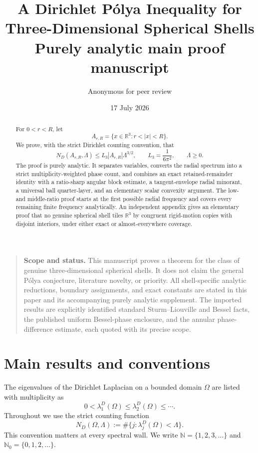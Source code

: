 \documentclass[11pt]{article}
\title{A Dirichlet P\'olya Inequality for\\Three-Dimensional Spherical Shells\\[0.4em]
\large Purely analytic main proof manuscript}
\author{Anonymous for peer review}
\date{17 July 2026}
\numberwithin{equation}{section}
\theoremstyle{definition}
\theoremstyle{remark}
\newcommand{\R}{\mathbb R}
\newcommand{\N}{\mathbb N}
\newcommand{\Nzero}{\mathbb N_0}
\begin{document}
\maketitle
\thispagestyle{titlepage}

\begin{quote}
\small
\textbf{Scope and status.}
This manuscript proves a theorem for the class of genuine three-dimensional
spherical shells.  It does not claim the general P\'olya conjecture,
literature novelty, or priority.  All shell-specific analytic reductions,
boundary assignments, and exact constants are stated in this paper and its
accompanying purely analytic supplement.  The imported results are explicitly
identified standard Sturm--Liouville and Bessel facts, the published uniform
Bessel-phase enclosure, and the annular phase-difference estimate, each quoted
with its precise scope.
\end{quote}

\begin{abstract}
For \(0<r<R\), let
\[
  A_{r,R}=\{x\in\R^3:r<|x|<R\}.
\]
We prove, with the strict Dirichlet counting convention, that
\[
  N_D(A_{r,R},\Lambda)
  \le L_3|A_{r,R}|\Lambda^{3/2},
  \qquad
  L_3=\frac1{6\pi^2},
  \qquad \Lambda\ge0.
\]
The proof is purely analytic.  It separates variables, converts the radial
spectrum into a strict multiplicity-weighted phase count, and combines an
exact retained-remainder identity with a ratio-sharp angular block estimate,
a tangent-envelope radial minorant, a universal ball quarter-layer, and an
elementary scalar convexity argument.  The low- and middle-ratio proof starts
at the first possible radial frequency and covers every remaining finite
frequency analytically.  An independent appendix gives an elementary proof
that no genuine spherical shell tiles \(\R^3\) by congruent
rigid-motion copies with disjoint interiors, under either exact or
almost-everywhere coverage.
\end{abstract}

\tableofcontents
\clearpage

\section{Main results and conventions}

The eigenvalues of the Dirichlet Laplacian on a bounded domain \(\Omega\) are
listed with multiplicity as
\[
  0<\lambda_1^D(\Omega)\le\lambda_2^D(\Omega)\le\cdots.
\]
Throughout we use the strict counting function
\begin{equation}
  N_D(\Omega,\Lambda)
  :=\#\{j:\lambda_j^D(\Omega)<\Lambda\}.
  \label{eq:strict-count}
\end{equation}
This convention matters at every spectral wall.  We write
\(\N=\{1,2,3,\ldots\}\) and \(\Nzero=\{0,1,2,\ldots\}\).
\end{document}
